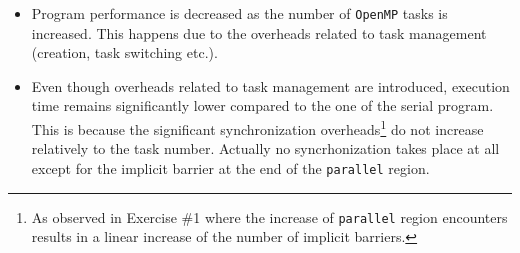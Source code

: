 \documentclass{article}
\def\code#1{\texttt{#1}}
\begin{document}
\begin{itemize}
 \item Program performance is decreased as the number of \texttt{OpenMP} tasks is increased.
       This happens due to the overheads related to task management (creation,
       task switching etc.).
 \item Even though overheads related to task management are introduced, execution time remains
       significantly lower compared to the one of the serial program. This is because
       the significant synchronization overheads\footnote{As observed in Exercise \#1 where
       the increase of \code{parallel} region encounters results in a linear increase of
       the number of implicit barriers.} do not increase relatively to the task number.
       Actually no syncrhonization takes place at all except for the implicit barrier
       at the end of the \code{parallel} region.
\end{itemize}
\end{document}
